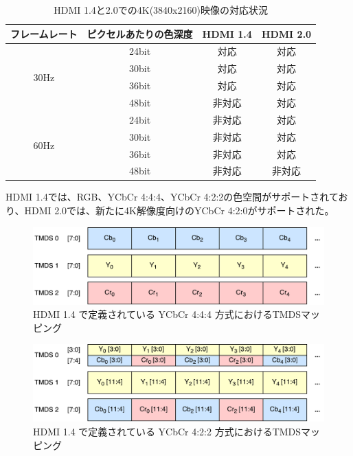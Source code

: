 \begin{table}[htbp]
  \caption{HDMI 1.4と2.0での4K(3840x2160)映像の対応状況}
  \label{tb:video-bandwidth}
  \begin{center}
  \begin{tabular}{c|c|c|c}
    \hline
      フレームレート & ピクセルあたりの色深度 & HDMI 1.4 & HDMI 2.0\\\hline\hline
    \multirow{4}{*}{30Hz} &
        24bit & 対応   & 対応 \\\cline{2-4}
      & 30bit & 対応   & 対応 \\\cline{2-4}
      & 36bit & 対応   & 対応 \\\cline{2-4}
      & 48bit & 非対応 & 対応 \\\hline
    \multirow{4}{*}{60Hz} &
        24bit & 非対応 & 対応  \\\cline{2-4}
      & 30bit & 非対応 & 対応  \\\cline{2-4}
      & 36bit & 非対応 & 対応  \\\cline{2-4}
      & 48bit & 非対応 & 非対応 \\\hline
  \end{tabular}\end{center}
\end{table}

HDMI 1.4\cite{hdmi-spec-1-4}では、RGB、YCbCr 4:4:4、YCbCr 4:2:2の色空間がサポートされており、HDMI 2.0\cite{hdmi-spec-2-0}では、新たに4K解像度向けのYCbCr 4:2:0がサポートされた。


\begin{figure}[htbp]
    \begin{center}
        \includegraphics[bb=0 0 531 141,width=13.926cm]{img/hdmi-spec-yuv-444.pdf}
    \end{center}
    \caption{HDMI 1.4 で定義されている YCbCr 4:4:4 方式におけるTMDSマッピング}
    \label{fig:hdmi-spec-yuv-444}
\end{figure}

\begin{figure}[htbp]
    \begin{center}
        \includegraphics[bb=0 0 531 141,width=13.926cm]{img/hdmi-spec-yuv-422.pdf}
    \end{center}
    \caption{HDMI 1.4 で定義されている YCbCr 4:2:2 方式におけるTMDSマッピング}
    \label{fig:hdmi-spec-yuv-422}
\end{figure}

